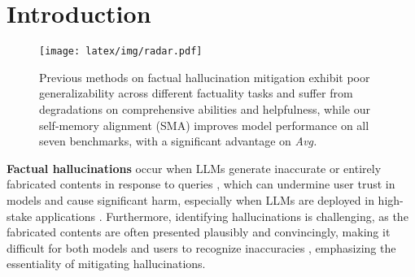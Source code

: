 \section{Introduction}
\begin{figure}[t]
  \texttt{[image: latex/img/radar.pdf]}
  \vspace{-3ex}
  \caption{Previous methods on factual hallucination mitigation exhibit poor generalizability across different factuality tasks and suffer from degradations on comprehensive abilities and helpfulness, while our self-memory alignment (SMA) improves model performance on all seven benchmarks, with a significant advantage on \textit{Avg.}}
  \label{fig:radar}
  \vspace{-2ex}
\end{figure}

\textbf{Factual hallucinations} occur when LLMs generate inaccurate or entirely fabricated contents in response to queries \citep{zhang2023siren, huang2023survey}, which can undermine user trust in models and cause significant harm, especially when LLMs are deployed in high-stake applications \citep{ji2023survey, ahmad2023creating, kang2023deficiency}. Furthermore, identifying hallucinations is challenging, as the fabricated contents are often presented plausibly and convincingly, making it difficult for both models and users to recognize inaccuracies \citep{kaddour2023challenges, zhang2023siren}, emphasizing the essentiality of mitigating hallucinations. 


